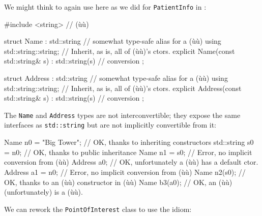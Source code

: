 \noindent We might think to again use  here as we
did for \lstinline!PatientInfo! in : 

\begin{emcppshiddenlisting}[emcppsbatch=e11]
#include <string>   // (ù{}ù)
\end{emcppshiddenlisting}
\begin{emcppslisting}[emcppsbatch=e11]
struct Name : std::string  // somewhat type-safe alias for a (ù{}ù)
{
    using std::string::string;  // Inherit, as is, all of (ù{}ù)'s ctors.
    explicit Name(const std::string& s) : std::string(s) { }  // conversion
};

struct Address : std::string  // somewhat type-safe alias for a (ù{}ù)
{
    using std::string::string;  // Inherit, as is, all of (ù{}ù)'s ctors.
    explicit Address(const std::string& s) : std::string(s) { }  // conversion
};
\end{emcppslisting}
    
\noindent The \lstinline!Name! and \lstinline!Address! types are not interconvertible; they expose the same interfaces as \lstinline!std::string! but are not
implicitly convertible from it:

\begin{emcppslisting}[emcppsbatch=e11]
Name n0 = "Big Tower";  // OK, thanks to inheriting constructors
std::string s0 = n0;    // OK, thanks to public inheritance
Name n1 = s0;           // Error, no implicit conversion from (ù{}ù)
Address a0;             // OK, unfortunately a (ù{}ù) has a default ctor.
Address a1 = n0;        // Error, no implicit conversion from (ù{}ù)
Name n2(s0);            // OK, thanks to an (ù{}ù) constructor in (ù{}ù)
Name b3(a0);            // OK, an (ù{}ù) (unfortunately) is a (ù{}ù).
\end{emcppslisting}
    
\noindent We can rework the \lstinline!PointOfInterest! class to use the
 idiom:

